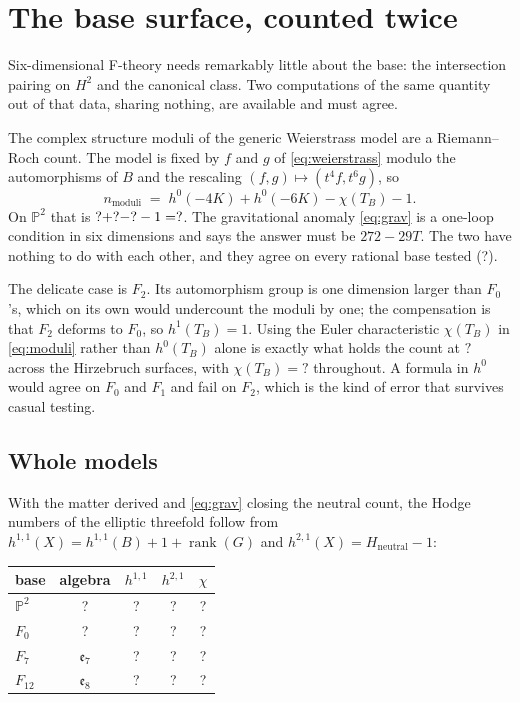\documentclass[11pt,a4paper]{article}
\newcommand{\SFPTwoHsix}{?}\newcommand{\SFPTwoChiT}{?}
\newcommand{\SFPTwoModuli}{?}\newcommand{\SFFTwoChiT}{?}
\newcommand{\SFFTwoModuli}{?}\newcommand{\SFModuliAgree}{?}
\newcommand{\SFPTwoHone}{?}\newcommand{\SFPTwoHtwo}{?}
\newcommand{\SFPTwoChi}{?}\newcommand{\SFPTwoAlg}{?}
\newcommand{\SFFZeroHone}{?}\newcommand{\SFFZeroHtwo}{?}
\newcommand{\SFFZeroChi}{?}\newcommand{\SFFZeroAlg}{?}
\newcommand{\SFFTwelveHone}{?}\newcommand{\SFFTwelveHtwo}{?}
\newcommand{\SFFTwelveChi}{?}\newcommand{\SFFTwelveAlg}{?}
\newcommand{\SFFSevenHone}{?}\newcommand{\SFFSevenHtwo}{?}
\newcommand{\SFFSevenChi}{?}\newcommand{\SFFSevenAlg}{?}
\newcommand{\PP}{\mathbb{P}}
\newcommand{\g}[1]{\mathfrak{#1}}
\theoremstyle{definition}
\begin{document}
\section{The base surface, counted twice}
\label{sec:bases}

Six-dimensional F-theory needs remarkably little about the base: the
intersection pairing on $H^2$ and the canonical class. Two computations of the
same quantity out of that data, sharing nothing, are available and must agree.

The complex structure moduli of the generic Weierstrass model are a
Riemann--Roch count. The model is fixed by $f$ and $g$ of \cref{eq:weierstrass}
modulo the automorphisms of $B$ and the rescaling
$(f,g) \mapsto (t^4 f, t^6 g)$, so
%
\begin{equation}
n_{\text{moduli}} \;=\; h^0(-4K) + h^0(-6K) - \chi(T_B) - 1 .
\label{eq:moduli}
\end{equation}
%
On $\PP^2$ that is $\SFPTwoHfour + \SFPTwoHsix - \SFPTwoChiT - 1 =
\SFPTwoModuli$. The gravitational anomaly \cref{eq:grav} is a one-loop
condition in six dimensions and says the answer must be $272 - 29T$. The two
have nothing to do with each other, and they agree on every rational base
tested (\SFModuliAgree).

The delicate case is $F_2$. Its automorphism group is one dimension larger
than $F_0$'s, which on its own would undercount the moduli by one; the
compensation is that $F_2$ deforms to $F_0$, so $h^1(T_B) = 1$. Using the
Euler characteristic $\chi(T_B)$ in \cref{eq:moduli} rather than $h^0(T_B)$
alone is exactly what holds the count at $\SFFTwoModuli$ across the Hirzebruch
surfaces, with $\chi(T_B) = \SFFTwoChiT$ throughout. A formula in $h^0$ would
agree on $F_0$ and $F_1$ and fail on $F_2$, which is the kind of error that
survives casual testing.

\subsection{Whole models}

With the matter derived and \cref{eq:grav} closing the neutral count, the
Hodge numbers of the elliptic threefold follow from
$h^{1,1}(X) = h^{1,1}(B) + 1 + \operatorname{rank}(G)$ and
$h^{2,1}(X) = H_{\text{neutral}} - 1$:

\begin{center}
\begin{tabular}{lcccc}
\toprule
base & algebra & $h^{1,1}$ & $h^{2,1}$ & $\chi$ \\
\midrule
$\PP^2$   & \SFPTwoAlg    & \SFPTwoHone    & \SFPTwoHtwo    & \SFPTwoChi \\
$F_0$     & \SFFZeroAlg   & \SFFZeroHone   & \SFFZeroHtwo   & \SFFZeroChi \\
$F_7$     & $\g{e}_7$     & \SFFSevenHone  & \SFFSevenHtwo  & \SFFSevenChi \\
$F_{12}$  & $\g{e}_8$     & \SFFTwelveHone & \SFFTwelveHtwo & \SFFTwelveChi \\
\bottomrule
\end{tabular}
\end{center}
\end{document}
